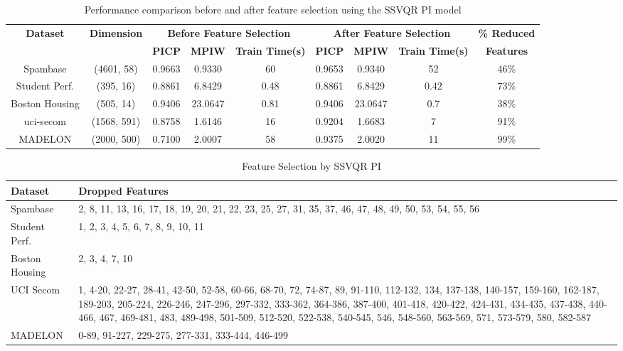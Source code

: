 \documentclass[10pt]{article} %
\begin{document}
\begin{table}[ht]
\centering
\renewcommand{\arraystretch}{1.5} %
\scriptsize
\begin{tabular}{|c|c|ccc|ccc|c|}
\hline
\textbf{Dataset} & \textbf{Dimension} & \multicolumn{3}{c|}{\textbf{Before Feature Selection}} & \multicolumn{3}{c|}{\textbf{After Feature Selection}} & \textbf{\% Reduced} \\
\cline{3-9}
 &  & \textbf{PICP} & \textbf{MPIW} & \textbf{ Train Time(s)} & \textbf{PICP} & \textbf{MPIW} & \textbf{ Train Time(s)} & \textbf{Features} \\
\hline
Spambase & (4601, 58) & 0.9663 & 0.9330 & 60  & 0.9653 & 0.9340 & 52 & 46\% \\
\hline
Student Perf. & (395, 16) & 0.8861 & 6.8429 & 0.48  & 0.8861 & 6.8429 & 0.42  & 73\% \\
\hline
Boston Housing & (505, 14) & 0.9406 & 23.0647 & 0.81  & 0.9406 & 23.0647 & 0.7 & 38\% \\
\hline
uci-secom & (1568, 591) & 0.8758 & 1.6146 & 16  & 0.9204 & 1.6683 & 7 & 91\% \\
\hline
MADELON & (2000, 500) & 0.7100 & 2.0007 & 58  & 0.9375 & 2.0020 & 11  & 99\% \\
\hline
\end{tabular}
\caption{Performance comparison before and after feature selection using the SSVQR PI model}
\label{tab23}
\end{table}






\begin{table}[htbp]
\centering
\scriptsize
\begin{tabular}{|l|p{14cm}|}
\hline
\textbf{Dataset} & \textbf{Dropped Features} \\ \hline
Spambase & 2, 8, 11, 13, 16, 17, 18, 19, 20, 21, 22, 23, 25, 27, 31, 35, 37, 46, 47, 48, 49, 50, 53, 54, 55, 56 \\ \hline
Student Perf. & 1, 2, 3, 4, 5, 6, 7, 8, 9, 10, 11 \\ \hline
Boston Housing & 2, 3, 4, 7, 10 \\ \hline
UCI Secom  & 1, 4-20, 22-27, 28-41, 42-50, 52-58, 60-66, 68-70, 72, 74-87, 89, 91-110, 112-132, 134, 137-138, 140-157, 159-160, 162-187, 189-203, 205-224, 226-246, 247-296, 297-332, 333-362, 364-386, 387-400, 401-418, 420-422, 424-431, 434-435, 437-438, 440-466, 467, 469-481, 483, 489-498, 501-509, 512-520, 522-538, 540-545, 546, 548-560, 563-569, 571, 573-579, 580, 582-587 \\ \hline
MADELON & 0-89, 91-227, 229-275, 277-331, 333-444, 446-499 \\ \hline
\end{tabular}
\caption{Feature Selection by SSVQR PI}
\label{tab:dropped_features}
\end{table}
\end{document}
